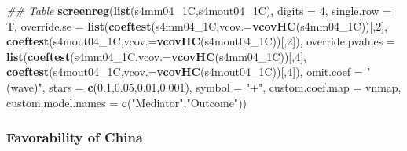 \documentclass[
]{article}
\newenvironment{Shaded}{\begin{snugshade}}{\end{snugshade}}
\newcommand{\CommentTok}[1]{\textcolor[rgb]{0.56,0.35,0.01}{\textit{#1}}}
\newcommand{\DataTypeTok}[1]{\textcolor[rgb]{0.13,0.29,0.53}{#1}}
\newcommand{\DecValTok}[1]{\textcolor[rgb]{0.00,0.00,0.81}{#1}}
\newcommand{\FloatTok}[1]{\textcolor[rgb]{0.00,0.00,0.81}{#1}}
\newcommand{\KeywordTok}[1]{\textcolor[rgb]{0.13,0.29,0.53}{\textbf{#1}}}
\newcommand{\NormalTok}[1]{#1}
\newcommand{\StringTok}[1]{\textcolor[rgb]{0.31,0.60,0.02}{#1}}
\begin{document}
\begin{Shaded}
\begin{Highlighting}[]
\CommentTok{## Table}
\KeywordTok{screenreg}\NormalTok{(}\KeywordTok{list}\NormalTok{(s4mm04_1C,s4mout04_1C), }\DataTypeTok{digits =} \DecValTok{4}\NormalTok{, }\DataTypeTok{single.row =}\NormalTok{ T,}
          \DataTypeTok{override.se =} \KeywordTok{list}\NormalTok{(}\KeywordTok{coeftest}\NormalTok{(s4mm04_1C,}\DataTypeTok{vcov.=}\KeywordTok{vcovHC}\NormalTok{(s4mm04_1C))[,}\DecValTok{2}\NormalTok{],}
                             \KeywordTok{coeftest}\NormalTok{(s4mout04_1C,}\DataTypeTok{vcov.=}\KeywordTok{vcovHC}\NormalTok{(s4mout04_1C))[,}\DecValTok{2}\NormalTok{]),}
          \DataTypeTok{override.pvalues =} \KeywordTok{list}\NormalTok{(}\KeywordTok{coeftest}\NormalTok{(s4mm04_1C,}\DataTypeTok{vcov.=}\KeywordTok{vcovHC}\NormalTok{(s4mm04_1C))[,}\DecValTok{4}\NormalTok{],}
                                  \KeywordTok{coeftest}\NormalTok{(s4mout04_1C,}\DataTypeTok{vcov.=}\KeywordTok{vcovHC}\NormalTok{(s4mout04_1C))[,}\DecValTok{4}\NormalTok{]),}
          \DataTypeTok{omit.coef =} \StringTok{"(wave)"}\NormalTok{, }\DataTypeTok{stars =} \KeywordTok{c}\NormalTok{(}\FloatTok{0.1}\NormalTok{,}\FloatTok{0.05}\NormalTok{,}\FloatTok{0.01}\NormalTok{,}\FloatTok{0.001}\NormalTok{), }\DataTypeTok{symbol =} \StringTok{"+"}\NormalTok{,}
          \DataTypeTok{custom.coef.map =}\NormalTok{ vnmap, }
          \DataTypeTok{custom.model.names =} \KeywordTok{c}\NormalTok{(}\StringTok{"Mediator"}\NormalTok{,}\StringTok{"Outcome"}\NormalTok{))}
\end{Highlighting}
\end{Shaded}

\hypertarget{favorability-of-china}{%
\subsubsection{Favorability of China}\label{favorability-of-china}}
\end{document}
